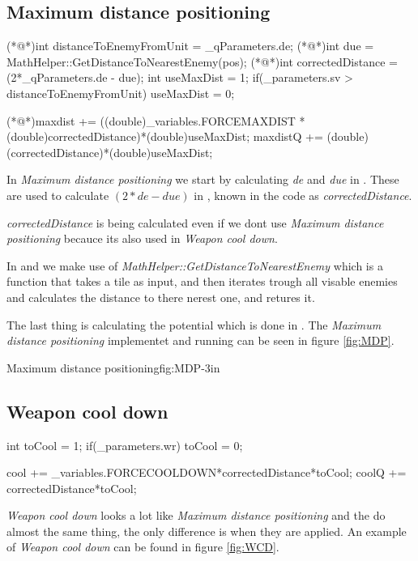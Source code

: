 	\subsection{Maximum distance positioning}
		\begin{Sourcecode}[caption=Maximum distance]
(*@\lnote@*)int distanceToEnemyFromUnit = _qParameters.de;
(*@\lnote@*)int due = MathHelper::GetDistanceToNearestEnemy(pos);
(*@\lnote@*)int correctedDistance = (2*_qParameters.de - due);
int useMaxDist = 1;
if(_parameters.sv > distanceToEnemyFromUnit)
	useMaxDist = 0;

(*@\lnote@*)maxdist += ((double)_variables.FORCEMAXDIST * (double)correctedDistance)*(double)useMaxDist;
maxdistQ += (double)(correctedDistance)*(double)useMaxDist;
\end{Sourcecode}
	
	In \textit{Maximum distance positioning} we start by calculating \textit{de} and \textit{due }in  . These are used to calculate $(2*de - due)$ in , known in the code as \textit{correctedDistance}. 
	
	\textit{correctedDistance} is being calculated even if we dont use \textit{Maximum distance positioning} becauce its also used in \textit{Weapon cool down}. 
	
	In  and  we make use of \textit{MathHelper::GetDistanceToNearestEnemy} which is a function that takes a tile as input, and then iterates trough all visable enemies and calculates the distance to there nerest one, and retures it.
	
	The last thing is calculating the potential which is done in . The \textit{Maximum distance positioning} implementet and running can be seen in figure \ref{fig:MDP}.

	
			{Maximum distance positioning}{fig:MDP}{-3in}

	\subsection{Weapon cool down}
		\begin{Sourcecode}[caption=Weapon cool down]
int toCool = 1;
if(_parameters.wr)
	toCool = 0;
	
cool += _variables.FORCECOOLDOWN*correctedDistance*toCool;
coolQ += correctedDistance*toCool;
\end{Sourcecode}	
	\textit{Weapon cool down} looks a lot like \textit{Maximum distance positioning} and the do almost the same thing, the only difference is when they are applied. An example of \textit{Weapon cool down} can be found in figure \ref{fig:WCD}.
	
